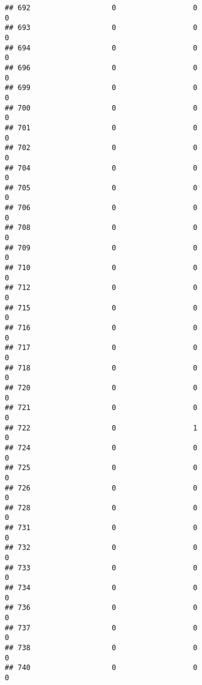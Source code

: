 \documentclass[
]{article}
\begin{document}
\begin{verbatim}
## 692                   0                  0                              0
## 693                   0                  0                              0
## 694                   0                  0                              0
## 696                   0                  0                              0
## 699                   0                  0                              0
## 700                   0                  0                              0
## 701                   0                  0                              0
## 702                   0                  0                              0
## 704                   0                  0                              0
## 705                   0                  0                              0
## 706                   0                  0                              0
## 708                   0                  0                              0
## 709                   0                  0                              0
## 710                   0                  0                              0
## 712                   0                  0                              0
## 715                   0                  0                              0
## 716                   0                  0                              0
## 717                   0                  0                              0
## 718                   0                  0                              0
## 720                   0                  0                              0
## 721                   0                  0                              0
## 722                   0                  1                              0
## 724                   0                  0                              0
## 725                   0                  0                              0
## 726                   0                  0                              0
## 728                   0                  0                              0
## 731                   0                  0                              0
## 732                   0                  0                              0
## 733                   0                  0                              0
## 734                   0                  0                              0
## 736                   0                  0                              0
## 737                   0                  0                              0
## 738                   0                  0                              0
## 740                   0                  0                              0

\end{verbatim}
\end{document}

